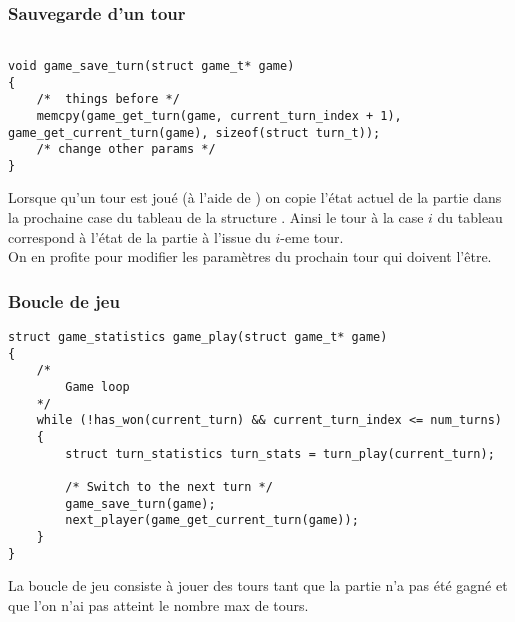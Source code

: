 \subsubsection{Sauvegarde d'un tour}


\begin{lstlisting}[frame=single, caption={Sauvegarde d'un tour}, label=save]

void game_save_turn(struct game_t* game)
{
    /*  things before */
	memcpy(game_get_turn(game, current_turn_index + 1), game_get_current_turn(game), sizeof(struct turn_t));	
    /* change other params */
}
\end{lstlisting}

Lorsque qu'un tour est joué (à l'aide de ) on copie l'état actuel de la partie dans la prochaine case du tableau  de la structure . Ainsi le tour à la case $i$ du tableau correspond à l'état de la partie à l'issue du $i$-eme tour. \\
On en profite pour modifier les paramètres du prochain tour qui doivent l'être.

\subsubsection{Boucle de jeu}

\begin{lstlisting}[frame=single, caption={Implémentation de la boucle de jeu}]
struct game_statistics game_play(struct game_t* game)
{
    /*
        Game loop
    */
    while (!has_won(current_turn) && current_turn_index <= num_turns)
    {
        struct turn_statistics turn_stats = turn_play(current_turn);
    
        /* Switch to the next turn */
        game_save_turn(game);
        next_player(game_get_current_turn(game));
    }
}
\end{lstlisting}

La boucle de jeu consiste à jouer des tours tant que la partie n'a pas été gagné et que l'on n'ai pas atteint le nombre max de tours.